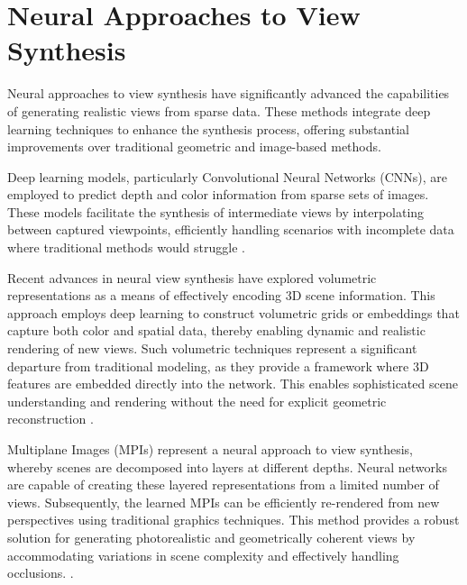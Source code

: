 
\section{Neural Approaches to View Synthesis}
Neural approaches to view synthesis have significantly advanced the capabilities of generating realistic views from sparse data.
These methods integrate deep learning techniques to enhance the synthesis process, offering substantial improvements over traditional geometric and image-based methods.

Deep learning models, particularly Convolutional Neural Networks (CNNs), are employed to predict depth and color information from sparse sets of images.
These models facilitate the synthesis of intermediate views by interpolating between captured viewpoints, efficiently handling scenarios with incomplete data where traditional methods would struggle \cite{kalantari_learning-based_2016,maxim_tatarchenko_single-view_2015,peter_hedman_deep_2019}.

Recent advances in neural view synthesis have explored volumetric representations as a means of effectively encoding 3D scene information.
This approach employs deep learning to construct volumetric grids or embeddings that capture both color and spatial data, thereby enabling dynamic and realistic rendering of new views.
Such volumetric techniques represent a significant departure from traditional modeling, as they provide a framework where 3D features are embedded directly into the network. This enables sophisticated scene understanding and rendering without the need for explicit geometric reconstruction \cite{lombardi_neural_2019,sitzmann_deepvoxels_2019}.

Multiplane Images (MPIs) represent a neural approach to view synthesis, whereby scenes are decomposed into layers at different depths.
Neural networks are capable of creating these layered representations from a limited number of views.
Subsequently, the learned MPIs can be efficiently re-rendered from new perspectives using traditional graphics techniques.
This method provides a robust solution for generating photorealistic and geometrically coherent views by accommodating variations in scene complexity and effectively handling occlusions. \cite{mildenhall_local_2019,penner_soft_2017,pratul_p_srinivasan_pushing_2019,tao_zhou_stereo_2018}.

